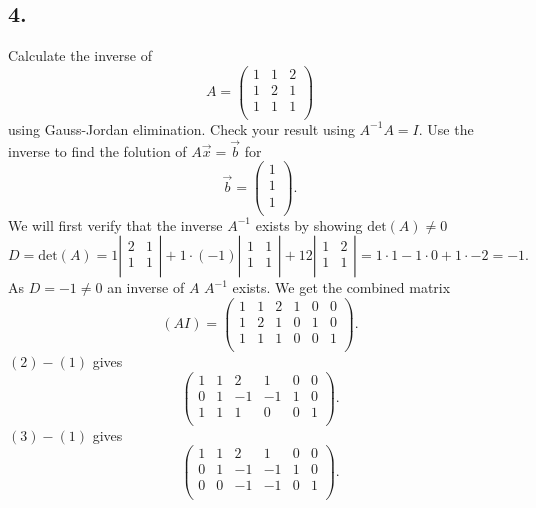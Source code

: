 \subsection*{4.}
Calculate the inverse of
\[ 
A = \begin{pmatrix}
1 & 1 & 2\\
1 & 2 & 1\\
1 & 1 & 1\\
\end{pmatrix}
\]
using Gauss-Jordan elimination. Check your result using $A^{-1} A = I$. Use the inverse to find the folution of $A \Vec{x} = \Vec{b}$ for
\[ 
\Vec{b} = \begin{pmatrix}
1\\
1\\
1\\
\end{pmatrix}
.\]
\bigbreak
We will first verify that the inverse $A^{-1}$ exists by showing $\mathrm{det}(A) \neq 0$
\[ 
D = \mathrm{det}(A) = 1 \left| \begin{array}{cc}
2 & 1\\
1 & 1\\
\end{array} \right| + 1 \cdot (-1) \left| \begin{array}{cc}
1 & 1\\
1 & 1\\
\end{array} \right| + 12\left| \begin{array}{cc}
1 & 2\\
1 & 1\\
\end{array} \right| = 1 \cdot 1 - 1 \cdot 0 + 1 \cdot -2 = -1
.\]
As $D = -1 \neq 0$ an inverse of $A$ $A^{-1}$ exists. We get the combined matrix
\[ 
  (AI) = \begin{pmatrix}
  1 & 1 & 2 & 1 & 0 & 0\\
  1 & 2 & 1 & 0 & 1 & 0\\
  1 & 1 & 1 & 0 & 0 & 1\\
  \end{pmatrix}
.\]
$(2) - (1)$ gives
\[ 
\begin{pmatrix}
1 & 1 & 2 & 1 & 0 & 0\\
0 & 1 & -1 & -1 & 1 & 0\\
1 & 1 & 1 & 0 & 0 & 1\\
\end{pmatrix}
.\]
$(3) - (1)$ gives
\[ 
\begin{pmatrix}
1 & 1 & 2 & 1 & 0 & 0\\
0 & 1 & -1 & -1 & 1 & 0\\
0 & 0 & -1 & -1 & 0 & 1\\
\end{pmatrix}
.\]
